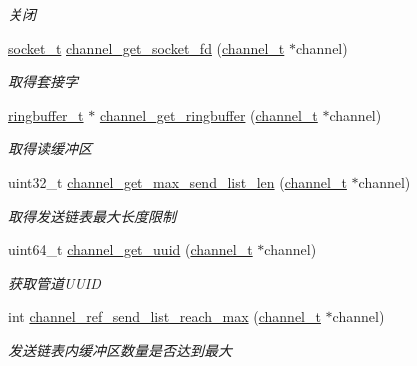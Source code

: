 \begin{DoxyCompactItemize}
\begin{DoxyCompactList}\small\item\em 关闭 \end{DoxyCompactList}\item 
\hyperlink{a00050_a0d9e0afbf02fb6ed6c5b1415dce51b05_a0d9e0afbf02fb6ed6c5b1415dce51b05}{socket\+\_\+t} \hyperlink{a00045_a950ec7a2a3c89032577fba60a59b1f91_a950ec7a2a3c89032577fba60a59b1f91}{channel\+\_\+get\+\_\+socket\+\_\+fd} (\hyperlink{a00050_a2effb3e20d0b7e5f6d5ac42118e0330b_a2effb3e20d0b7e5f6d5ac42118e0330b}{channel\+\_\+t} $\ast$channel)
\begin{DoxyCompactList}\small\item\em 取得套接字 \end{DoxyCompactList}\item 
\hyperlink{a00050_af929c5cf86b6a0f64dde407dfe60482e_af929c5cf86b6a0f64dde407dfe60482e}{ringbuffer\+\_\+t} $\ast$ \hyperlink{a00045_aa7ab12f174b1d8384b1c3ef3b15bd83b_aa7ab12f174b1d8384b1c3ef3b15bd83b}{channel\+\_\+get\+\_\+ringbuffer} (\hyperlink{a00050_a2effb3e20d0b7e5f6d5ac42118e0330b_a2effb3e20d0b7e5f6d5ac42118e0330b}{channel\+\_\+t} $\ast$channel)
\begin{DoxyCompactList}\small\item\em 取得读缓冲区 \end{DoxyCompactList}\item 
uint32\+\_\+t \hyperlink{a00045_a855f29f5cb8f5c0420af7a377bd2f531_a855f29f5cb8f5c0420af7a377bd2f531}{channel\+\_\+get\+\_\+max\+\_\+send\+\_\+list\+\_\+len} (\hyperlink{a00050_a2effb3e20d0b7e5f6d5ac42118e0330b_a2effb3e20d0b7e5f6d5ac42118e0330b}{channel\+\_\+t} $\ast$channel)
\begin{DoxyCompactList}\small\item\em 取得发送链表最大长度限制 \end{DoxyCompactList}\item 
uint64\+\_\+t \hyperlink{a00045_af23ca0f2b9462f153a4236d787f9f25a_af23ca0f2b9462f153a4236d787f9f25a}{channel\+\_\+get\+\_\+uuid} (\hyperlink{a00050_a2effb3e20d0b7e5f6d5ac42118e0330b_a2effb3e20d0b7e5f6d5ac42118e0330b}{channel\+\_\+t} $\ast$channel)
\begin{DoxyCompactList}\small\item\em 获取管道\+U\+U\+I\+D \end{DoxyCompactList}\item 
int \hyperlink{a00045_a755d848b2b5d58cf883ef1b66950274c_a755d848b2b5d58cf883ef1b66950274c}{channel\+\_\+ref\+\_\+send\+\_\+list\+\_\+reach\+\_\+max} (\hyperlink{a00050_a2effb3e20d0b7e5f6d5ac42118e0330b_a2effb3e20d0b7e5f6d5ac42118e0330b}{channel\+\_\+t} $\ast$channel)
\begin{DoxyCompactList}\small\item\em 发送链表内缓冲区数量是否达到最大 \end{DoxyCompactList}\end{DoxyCompactItemize}


